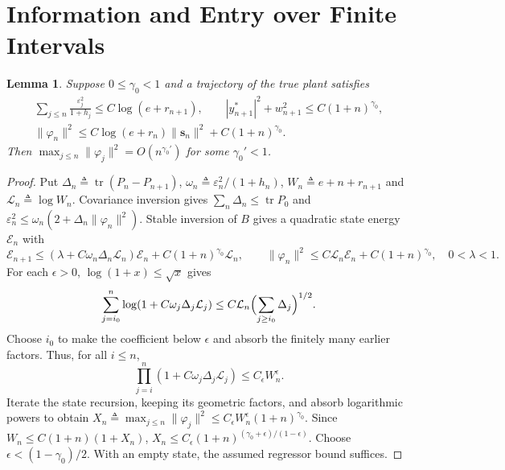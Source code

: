 \documentclass[11pt,reqno]{amsart}
\numberwithin{equation}{section}
\newtheorem{lemma}[theorem]{Lemma}
\theoremstyle{definition}
\theoremstyle{remark}
\newcommand{\ph}{\varphi}
\newcommand{\tr}{\operatorname{tr}}
\begin{document}
\section{Information and Entry over Finite Intervals}\label{sec:burstdetail}
\begin{lemma}\label{lem:growth}
Suppose $0\le\gamma_0<1$ and a trajectory of the true plant satisfies
\[
 \begin{gathered}
 \sum_{j\le n}\frac{\varepsilon_j^2}{1+h_j}\le C\log(e+r_{n+1}),\qquad
 |y_{n+1}^*|^2+w_{n+1}^2\le C(1+n)^{\gamma_0},\\
 \|\ph_n\|^2\le C\log(e+r_n)\|\mathbf s_n\|^2+C(1+n)^{\gamma_0}.
 \end{gathered}
\]
Then $\max_{j\le n}\|\ph_j\|^2=O(n^{\gamma_0'})$ for some $\gamma_0'<1$.
\end{lemma}
\begin{proof}
Put $\Delta_n\triangleq\tr(P_n-P_{n+1})$, $\omega_n\triangleq\varepsilon_n^2/(1+h_n)$,
$W_n\triangleq e+n+r_{n+1}$ and $\mathcal L_n\triangleq\log W_n$.
Covariance inversion gives $\sum_n\Delta_n\le\tr P_0$ and
$\varepsilon_n^2\le\omega_n(2+\Delta_n\|\ph_n\|^2)$.
Stable inversion of $B$ gives a quadratic state energy $\mathcal E_n$ with
\[
 \mathcal E_{n+1}\le(\lambda+C\omega_n\Delta_n\mathcal L_n)\mathcal E_n
                +C(1+n)^{\gamma_0}\mathcal L_n,\qquad
 \|\ph_n\|^2\le C\mathcal L_n\mathcal E_n+C(1+n)^{\gamma_0},\quad0<\lambda<1.
\]
For each $\epsilon>0$, $\log(1+x)\le\sqrt{x}$ gives
\[
 \sum_{j=i_0}^n\log(1+C\omega_j\Delta_j\mathcal L_j)
 \le C\mathcal L_n\Bigl(\sum_{j\ge i_0}\Delta_j\Bigr)^{1/2}.
\]
Choose $i_0$ to make the coefficient below $\epsilon$ and absorb the
finitely many earlier factors. Thus, for all $i\le n$,
\begin{equation*}
 \prod_{j=i}^n(1+C\omega_j\Delta_j\mathcal L_j)\le C_\epsilon W_n^\epsilon.
\end{equation*}
Iterate the state recursion, keeping its geometric factors, and absorb
logarithmic powers to obtain
$X_n\triangleq \max_{j\le n}\|\ph_j\|^2\le C_\epsilon W_n^\epsilon(1+n)^{\gamma_0}$.
Since $W_n\le C(1+n)(1+X_n)$,
$X_n\le C_\epsilon(1+n)^{(\gamma_0+\epsilon)/(1-\epsilon)}$.
Choose $\epsilon<(1-\gamma_0)/2$. With an empty state, the assumed regressor bound suffices.
\end{proof}
\end{document}
